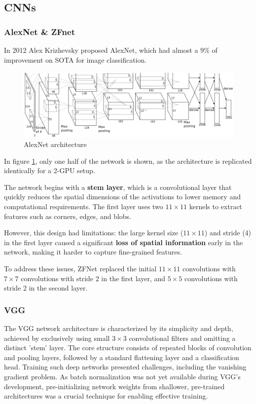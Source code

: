 \subsection{CNNs}

\subsubsection{AlexNet \& ZFnet}
In 2012 Alex Krizhevsky proposed AlexNet, which had almost a $9\%$ of improvement on SOTA for image classification.

\begin{figure}[htbp]
  \centering
  \includegraphics[width=0.8\linewidth]{./img/alexnet.png}
  \caption{AlexNet architecture}
  \label{fig:alexnet}
\end{figure}

In figure \ref{fig:alexnet}, only one half of the network is shown, as the architecture is replicated identically for a 2-GPU setup.

The network begins with a \textbf{stem layer}, which is a convolutional layer that quickly reduces the spatial dimensions of the activations to lower memory and computational requirements.
The first layer uses two $11 \times 11$ kernels to extract features such as corners, edges, and blobs.

However, this design had limitations: the large kernel size ($11 \times 11$) and stride (4) in the first layer caused a significant \textbf{loss of spatial information} early in the network, making it harder to capture fine-grained features.

To address these issues, ZFNet replaced the initial $11 \times 11$ convolutions with $7 \times 7$ convolutions with stride 2 in the first layer, and $5 \times 5$ convolutions with stride 2 in the second layer.

\subsubsection{VGG}
The VGG network architecture is characterized by its simplicity and depth, achieved by exclusively using small $3 \times 3$ convolutional filters and omitting a distinct 'stem' layer. The core structure consists of repeated blocks of convolution and pooling layers, followed by a standard flattening layer and a classification head. Training such deep networks presented challenges, including the vanishing gradient problem. As batch normalization was not yet available during VGG's development, pre-initializing network weights from shallower, pre-trained architectures was a crucial technique for enabling effective training.

